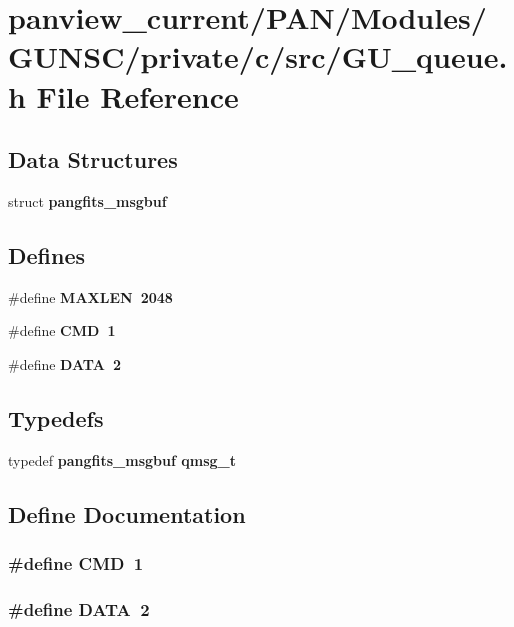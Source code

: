 \section{panview\_\-current/PAN/Modules/GUNSC/private/c/src/GU\_\-queue.h File Reference}
\label{GU__queue_8h}
\subsection*{Data Structures}
\begin{CompactItemize}
\item 
struct \bf{pangfits\_\-msgbuf}
\end{CompactItemize}
\subsection*{Defines}
\begin{CompactItemize}
\item 
\#define \bf{MAXLEN}~2048
\item 
\#define \bf{CMD}~1
\item 
\#define \bf{DATA}~2
\end{CompactItemize}
\subsection*{Typedefs}
\begin{CompactItemize}
\item 
typedef \bf{pangfits\_\-msgbuf} \bf{qmsg\_\-t}
\end{CompactItemize}


\subsection{Define Documentation}
\subsubsection{\setlength{\rightskip}{0pt plus 5cm}\#define CMD~1}\label{GU__queue_8h_0a5ceb9ceb914e08d345410b561cb37a}


\subsubsection{\setlength{\rightskip}{0pt plus 5cm}\#define DATA~2}\label{GU__queue_8h_ad9ae913bdfab20dd94ad04ee2d5b045}


